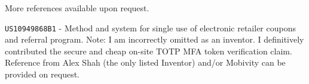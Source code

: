 \documentclass[10pt,letter,ragged2e]{altacv}
\begin{document}
\begin{paracol}{2}



\divider


\divider


\divider

More references available upon request.



\texttt{US10949868B1} - Method and system for single use of electronic retailer coupons and referral program. Note: I am incorrectly omitted as an inventor. I definitively contributed the secure and cheap on-site TOTP MFA token verification claim. Reference from Alex Shah (the only listed Inventor) and/or Mobivity can be provided on request.


\end{paracol}
\end{document}
